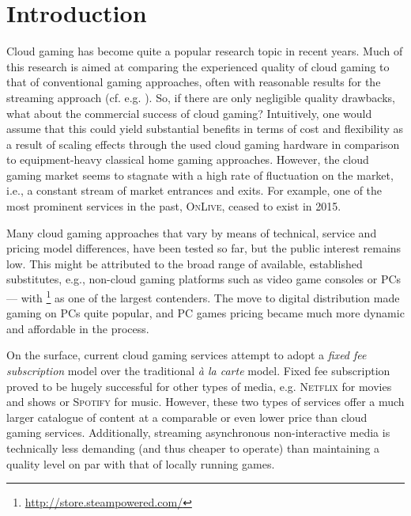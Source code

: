 

\section{Introduction}

Cloud gaming has become quite a popular research topic in recent years. Much of this research is aimed at comparing the experienced quality of cloud gaming to that of conventional gaming approaches, often with reasonable results for the streaming approach (cf. e.g. \cite{5976180}). So, if there are only negligible quality drawbacks, what about the commercial success of cloud gaming? Intuitively, one would assume that this could yield substantial benefits in terms of cost and flexibility as a result of scaling effects through the used cloud gaming hardware in comparison to equipment-heavy classical home gaming approaches. However, the cloud gaming market seems to stagnate with a high rate of fluctuation on the market, i.e., a constant stream of market entrances and exits. For example, one of the most prominent services in the past, \textsc{OnLive}, ceased to exist in 2015.




Many cloud gaming approaches that vary by means of technical, service and pricing model differences, have been tested so far, but the public interest remains low. This might be attributed to the broad range of available, established substitutes, e.g., non-cloud gaming platforms such as video game consoles or PCs --- with \steam\footnote{\url{http://store.steampowered.com/}} as one of the largest contenders. The move to digital distribution made gaming on PCs quite popular, and PC games pricing became much more dynamic and affordable in the process.

On the surface, current cloud gaming services attempt to adopt a \textit{fixed fee subscription} model over the traditional \textit{à la carte} model. Fixed fee subscription proved to be hugely successful for other types of media, e.g. \textsc{Netflix} for movies and shows or \textsc{Spotify} for music. However, these two types of services offer a much larger catalogue of content at a comparable or even lower price than cloud gaming services. Additionally, streaming asynchronous non-interactive media is technically less demanding (and thus cheaper to operate) than maintaining a quality level on par with that of locally running games.

